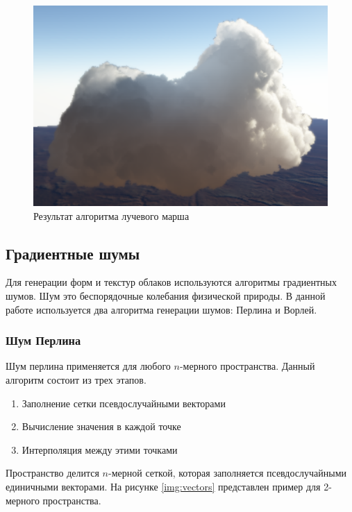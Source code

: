 \begin{figure}[H]
    \centering
    \includegraphics[scale=0.4]{img/raymach.png}
    \caption{Результат алгоритма лучевого марша}
    \label{img:raymach}
\end{figure}

\subsection{Градиентные шумы}

Для генерации форм и текстур облаков используются алгоритмы градиентных шумов.
Шум это беспорядочные колебания физической природы. В данной работе используется два алгоритма
генерации шумов: Перлина и Ворлей.

\subsubsection{Шум Перлина}

Шум перлина применяется для любого $n$-мерного пространства. Данный алгоритм состоит из трех этапов.

\begin{enumerate}
    \item Заполнение сетки псевдослучайными векторами
    \item Вычисление значения в каждой точке
    \item Интерполяция между этими точками
\end{enumerate}

Пространство делится $n$-мерной сеткой, которая заполняется псевдослучайными единичными векторами.
На рисунке \ref{img:vectors} представлен пример для 2-мерного пространства.

